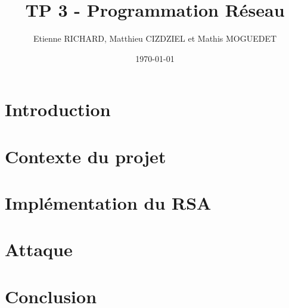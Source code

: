\documentclass[12pt]{article}
\title{TP 3 - Programmation Réseau}	\let\Title\@title
\author{Etienne RICHARD, Matthieu CIZDZIEL et Mathis MOGUEDET} \let\Author\@author
\date{\today}           	\let\Date\@date
\begin{document}
\maketitle
\pagebreak

\tableofcontents
\pagebreak

\section*{Introduction}

\section{Contexte du projet}


\section{Implémentation du RSA}


\section{Attaque}


\section*{Conclusion}
\end{document}
